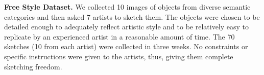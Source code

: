 


\noindent\textbf{Free Style Dataset.} We collected 10 images of objects from diverse semantic categories and then asked 7 artists to sketch them. The objects were chosen to be detailed enough to adequately reflect artistic style and to be relatively easy to replicate by an experienced artist in a reasonable amount of time. The 70 sketches (10 from each artist) were collected in three weeks. No constraints or specific instructions were given to the artists, thus, giving them complete sketching freedom.


